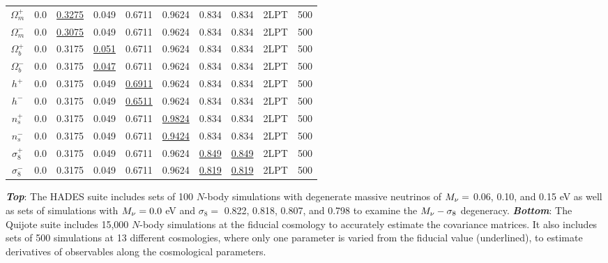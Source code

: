 \begin{table}
\begin{center}
\begin{tabular}{cccccccccc}
    $\Omega_m^+$    & 0.0   & \underline{ 0.3275} & 0.049 & 0.6711 & 0.9624 & 0.834 & 0.834 & 2LPT & 500 \\ 
    $\Omega_m^-$    & 0.0   & \underline{ 0.3075} & 0.049 & 0.6711 & 0.9624 & 0.834 & 0.834 & 2LPT & 500 \\ 
    $\Omega_b^+$    & 0.0   & 0.3175 & \underline{0.051} & 0.6711 & 0.9624 & 0.834 & 0.834 & 2LPT & 500 \\ 
    $\Omega_b^-$    & 0.0   & 0.3175 & \underline{0.047} & 0.6711 & 0.9624 & 0.834 & 0.834 & 2LPT & 500 \\ 
    $h^+$           & 0.0   & 0.3175 & 0.049 & \underline{0.6911} & 0.9624 & 0.834 & 0.834 & 2LPT & 500 \\ 
    $h^-$           & 0.0   & 0.3175 & 0.049 & \underline{0.6511} & 0.9624 & 0.834 & 0.834 & 2LPT & 500 \\ 
    $n_s^+$         & 0.0   & 0.3175 & 0.049 & 0.6711 & \underline{0.9824} & 0.834 & 0.834 & 2LPT & 500 \\ 
    $n_s^-$         & 0.0   & 0.3175 & 0.049 & 0.6711 & \underline{0.9424} & 0.834 & 0.834 & 2LPT & 500 \\ 
    $\sigma_8^+$    & 0.0   & 0.3175 & 0.049 & 0.6711 & 0.9624 & \underline{0.849} & \underline{0.849} & 2LPT & 500 \\ 
    $\sigma_8^-$    & 0.0   & 0.3175 & 0.049 & 0.6711 & 0.9624 & \underline{0.819} & \underline{0.819} & 2LPT & 500 \\[3pt]
    \hline
\end{tabular} \label{tab:sims}
\end{center}
    {\bf \em Top}: The HADES suite includes sets of 100 $N$-body simulations with degenerate massive neutrinos 
    of $M_\nu = $ 0.06, 0.10, and 0.15 eV as well as sets of simulations with $M_\nu = 0.0$ eV and 
    $\sigma_8 = $ 0.822, 0.818, 0.807, and 0.798 to examine the $M_\nu-\sigma_8$ degeneracy. 
    {\bf \em Bottom}: The Quijote suite includes 15,000 $N$-body simulations at the fiducial 
    cosmology to accurately estimate the covariance matrices. It also includes sets of 500 
    simulations at 13 different cosmologies, where only one parameter is varied from the fiducial 
    value (underlined), to estimate derivatives of observables along the cosmological parameters.
\end{table}
